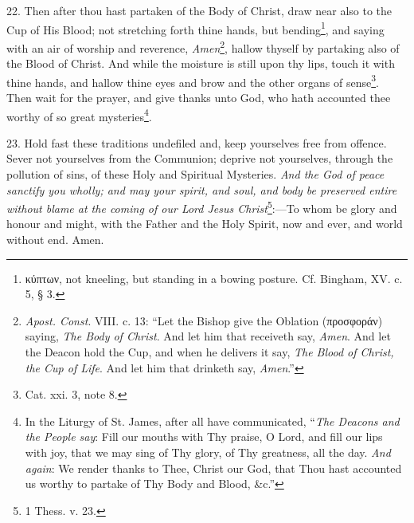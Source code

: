 22. Then after thou hast partaken of the Body of Christ, draw near also to the Cup of His Blood; not stretching forth thine hands, but bending\footnote{\textgreek{κύπτων}, not kneeling, but standing in a bowing posture. Cf. Bingham, XV. c. 5, § 3.}, and saying with an air of worship and reverence, \emph{Amen}\footnote{\emph{Apost. Const}. VIII. c. 13: “Let the Bishop give the Oblation (\textgreek{προσφοράν}) saying, \emph{The Body of Christ}. And let him that receiveth say, \emph{Amen}. And let the Deacon hold the Cup, and when he delivers it say, \emph{The Blood of Christ, the Cup of Life}. And let him that drinketh say, \emph{Amen}.”}, hallow thyself by partaking also of the Blood of Christ. And while the moisture is still upon thy lips, touch it with thine hands, and hallow thine eyes and brow and the other organs of sense\footnote{Cat. xxi. 3, note 8.}. Then wait for the prayer, and give thanks unto God, who hath accounted thee worthy of so great mysteries\footnote{In the Liturgy of St. James, after all have communicated, “\emph{The Deacons and the People say}: Fill our mouths with Thy praise, O Lord, and fill our lips with joy, that we may sing of Thy glory, of Thy greatness, all the day. \emph{And again}: We render thanks to Thee, Christ our God, that Thou hast accounted us worthy to partake of Thy Body and Blood, \&c.”}.

23. Hold fast these traditions undefiled and, keep yourselves free from offence. Sever not yourselves from the Communion; deprive not yourselves, through the pollution of sins, of these Holy and Spiritual Mysteries. \emph{And the God of peace sanctify you wholly; and may your spirit, and soul, and body be preserved entire without blame at the coming of our Lord Jesus Christ}\footnote{1 Thess. v. 23.}:—To whom be glory and honour and might, with the Father and the Holy Spirit, now and ever, and world without end. Amen.
